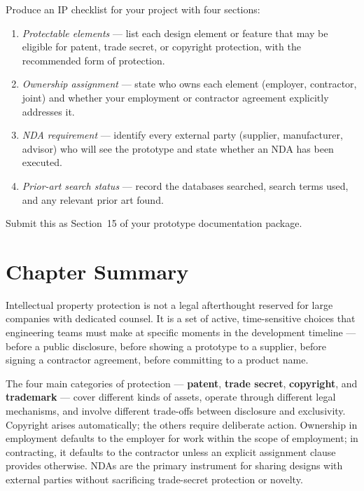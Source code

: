 Produce an IP checklist for your project with four sections:
\begin{enumerate}
  \item[(a)] \textit{Protectable elements} --- list each design element or feature
             that may be eligible for patent, trade secret, or copyright
             protection, with the recommended form of protection.
  \item[(b)] \textit{Ownership assignment} --- state who owns each element
             (employer, contractor, joint) and whether your employment or
             contractor agreement explicitly addresses it.
  \item[(c)] \textit{NDA requirement} --- identify every external party
             (supplier, manufacturer, advisor) who will see the prototype and
             state whether an NDA has been executed.
  \item[(d)] \textit{Prior-art search status} --- record the databases searched,
             search terms used, and any relevant prior art found.
\end{enumerate}
Submit this as Section~15 of your prototype documentation package.

\section*{Chapter Summary}
\label{sec:ch15-summary}

Intellectual property protection is not a legal afterthought reserved for large
companies with dedicated counsel.
It is a set of active, time-sensitive choices that engineering teams must make at
specific moments in the development timeline --- before a public disclosure, before
showing a prototype to a supplier, before signing a contractor agreement, before
committing to a product name.

The four main categories of protection --- \textbf{patent}, \textbf{trade
secret}, \textbf{copyright}, and \textbf{trademark} --- cover different kinds of
assets, operate through different legal mechanisms, and involve different
trade-offs between disclosure and exclusivity.
Copyright arises automatically; the others require deliberate action.
Ownership in employment defaults to the employer for work within the scope of
employment; in contracting, it defaults to the contractor unless an explicit
assignment clause provides otherwise.
NDAs are the primary instrument for sharing designs with external parties without
sacrificing trade-secret protection or novelty.

